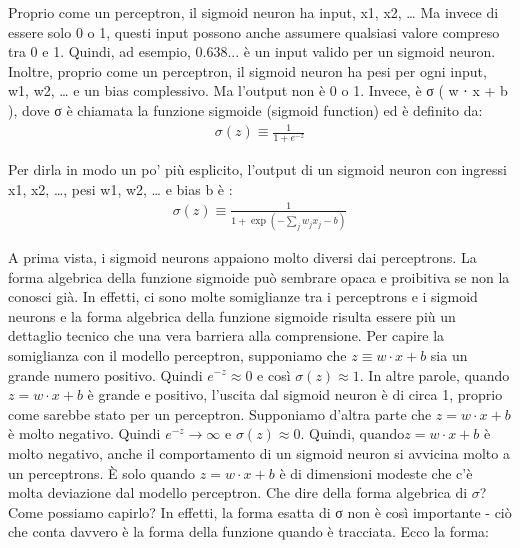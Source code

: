 Proprio come un perceptron, il sigmoid neuron ha input, x1, x2, … Ma invece di essere solo 0 o 1, questi input possono anche assumere qualsiasi valore compreso tra 0 e 1. Quindi, ad esempio, 0.638... è un input valido per un sigmoid neuron. Inoltre, proprio come un perceptron, il sigmoid neuron ha pesi per ogni input, w1, w2, … e un bias complessivo. Ma l'output non è 0 o 1. 
Invece, è σ ( w ⋅ x + b ), dove σ è chiamata la funzione sigmoide (sigmoid function) ed è definito da:\\

\begin{eqnarray} 
\sigma(z) \equiv \frac{1}{1 + e^{-z}}
\end{eqnarray}

Per dirla in modo un po' più esplicito, l'output di un sigmoid neuron con ingressi x1, x2, …, pesi w1, w2, … e bias b è : \\
\begin{eqnarray} 
\sigma(z) \equiv \frac{1}{1+\exp(-\sum_j w_j x_j-b)}
\end{eqnarray}


A prima vista, i sigmoid neurons appaiono molto diversi dai perceptrons. La forma algebrica della funzione sigmoide può sembrare opaca e proibitiva se non la conosci già. In effetti, ci sono molte somiglianze tra i perceptrons e i sigmoid neurons e la forma algebrica della funzione sigmoide risulta essere più un dettaglio tecnico che una vera barriera alla comprensione.
Per capire la somiglianza con il modello perceptron, supponiamo che 
$z \equiv  w \cdot x + b$ sia un grande numero positivo. Quindi $e^{-z} \approx 0$ e così $\sigma(z) \approx 1$.
In altre parole, quando $z= w \cdot x + b$ è grande e positivo, l'uscita dal sigmoid neuron è di circa 1, proprio come sarebbe stato per un perceptron. Supponiamo d'altra parte che $z = w \cdot x + b$ è molto negativo. Quindi $e^{-z} \to \infty$ e $\sigma(z) \approx 0$. Quindi, quando$ z= w \cdot x + b$ è molto negativo, anche il comportamento di un sigmoid neuron si avvicina molto a un perceptrons. È solo quando $z = w \cdot x + b$ è di dimensioni modeste che c'è molta deviazione dal modello perceptron.
Che dire della forma algebrica di $\sigma$? Come possiamo capirlo? In effetti, la forma esatta di σ non è così importante - ciò che conta davvero è la forma della funzione quando è tracciata. Ecco la forma:

